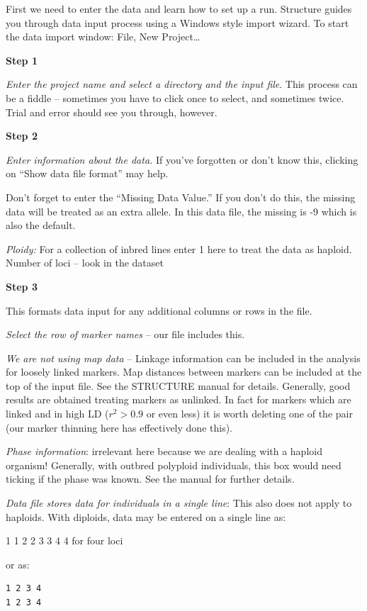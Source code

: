 \documentclass[
]{book}
\begin{document}
First we need to enter the data and learn how to set up a run. Structure guides you through data input process using a Windows style import wizard. To start the data import window: File, New Project\ldots{}

\textbf{Step 1}

\emph{Enter the project name and select a directory and the input file}. This process can be a fiddle -- sometimes you have to click once to select, and sometimes twice. Trial and error should see you through, however.

\textbf{Step 2}

\emph{Enter information about the data.} If you've forgotten or don't know this, clicking on ``Show data file format'' may help.

Don't forget to enter the ``Missing Data Value.'' If you don't do this, the missing data will be treated as an extra allele. In this data file, the missing is -9 which is also the default.

\emph{Ploidy:} For a collection of inbred lines enter 1 here to treat the data as haploid. Number of loci -- look in the dataset

\textbf{Step 3}

This formats data input for any additional columns or rows in the file.

\emph{Select the row of marker names} -- our file includes this.

\emph{We are not using map data} -- Linkage information can be included in the analysis for loosely linked markers. Map distances between markers can be included at the top of the input file. See the STRUCTURE manual for details. Generally, good results are obtained treating markers as unlinked. In fact for markers which are linked and in high LD (\(r^2>0.9\) or even less) it is worth deleting one of the pair (our marker thinning here has effectively done this).

\emph{Phase information}: irrelevant here because we are dealing with a haploid organism! Generally, with outbred polyploid individuals, this box would need ticking if the phase was known. See the manual for further details.

\emph{Data file stores data for individuals in a single line}: This also does not apply to haploids. With diploids, data may be entered on a single line as:

1 1 2 2 3 3 4 4 for four loci

or as:

\begin{verbatim}
1 2 3 4 
1 2 3 4 
\end{verbatim}
\end{document}
